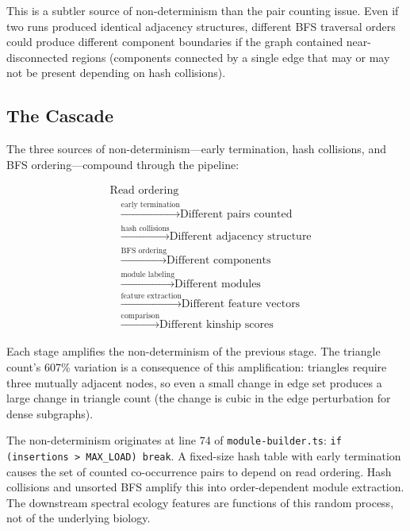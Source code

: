\documentclass{../yalumba}
\begin{document}
This is a subtler source of non-determinism than the pair counting issue. Even
if two runs produced identical adjacency structures, different BFS traversal
orders could produce different component boundaries if the graph contained
near-disconnected regions (components connected by a single edge that may or
may not be present depending on hash collisions).

\subsection{The Cascade}
\label{sec:cascade}

The three sources of non-determinism---early termination, hash collisions, and
BFS ordering---compound through the pipeline:

\begin{equation}
\boxed{
\begin{aligned}
  &\text{Read ordering} \\
  &\quad \xrightarrow{\text{early termination}} \text{Different pairs counted} \\
  &\quad \xrightarrow{\text{hash collisions}} \text{Different adjacency structure} \\
  &\quad \xrightarrow{\text{BFS ordering}} \text{Different components} \\
  &\quad \xrightarrow{\text{module labeling}} \text{Different modules} \\
  &\quad \xrightarrow{\text{feature extraction}} \text{Different feature vectors} \\
  &\quad \xrightarrow{\text{comparison}} \text{Different kinship scores}
\end{aligned}
}
\label{eq:cascade}
\end{equation}

Each stage amplifies the non-determinism of the previous stage. The triangle
count's 607\% variation is a consequence of this amplification: triangles require
three mutually adjacent nodes, so even a small change in edge set produces a
large change in triangle count (the change is cubic in the edge perturbation
for dense subgraphs).

\begin{keyfinding}
The non-determinism originates at line 74 of \texttt{module-builder.ts}:
\texttt{if (insertions > MAX\_LOAD) break}. A fixed-size hash table with early
termination causes the set of counted co-occurrence pairs to depend on read
ordering. Hash collisions and unsorted BFS amplify this into order-dependent
module extraction. The downstream spectral ecology features are functions of
this random process, not of the underlying biology.
\end{keyfinding}
\end{document}
